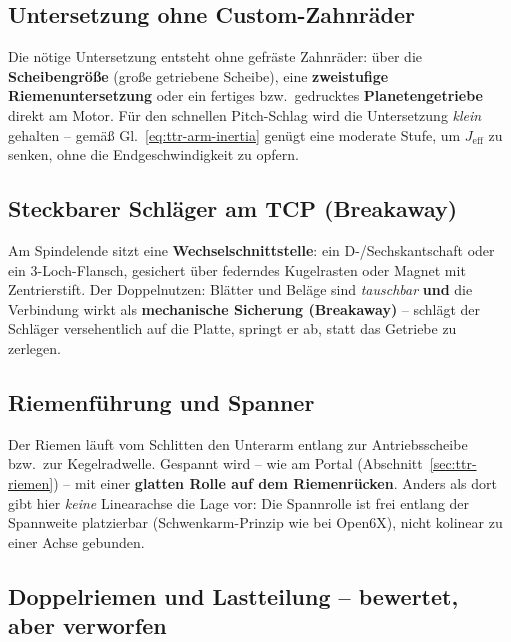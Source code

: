 \subsection{Untersetzung ohne Custom-Zahnr\"ader}
\label{sec:ttr-arm-untersetzung}

Die n\"otige Untersetzung entsteht ohne gefr\"aste Zahnr\"ader: \"uber die
\textbf{Scheibengr\"o\ss e} (gro\ss e getriebene Scheibe), eine
\textbf{zweistufige Riemenuntersetzung} oder ein fertiges bzw.\ gedrucktes
\textbf{Planetengetriebe} direkt am Motor. F\"ur den schnellen Pitch-Schlag wird
die Untersetzung \emph{klein} gehalten -- gem\"a\ss{}
Gl.~\eqref{eq:ttr-arm-inertia} gen\"ugt eine moderate Stufe, um $J_{\mathrm{eff}}$
zu senken, ohne die Endgeschwindigkeit zu opfern.

\subsection{Steckbarer Schl\"ager am TCP (Breakaway)}
\label{sec:ttr-arm-breakaway}

Am Spindelende sitzt eine \textbf{Wechselschnittstelle}: ein D-/Sechskantschaft
oder ein 3-Loch-Flansch, gesichert \"uber federndes Kugelrasten oder Magnet mit
Zentrierstift. Der Doppelnutzen: Bl\"atter und Bel\"age sind \emph{tauschbar}
\textbf{und} die Verbindung wirkt als \textbf{mechanische Sicherung (Breakaway)}
-- schl\"agt der Schl\"ager versehentlich auf die Platte, springt er ab, statt das
Getriebe zu zerlegen.

\subsection{Riemenf\"uhrung und Spanner}
\label{sec:ttr-arm-riemen}

Der Riemen l\"auft vom Schlitten den Unterarm entlang zur Antriebsscheibe bzw.\
zur Kegelradwelle. Gespannt wird -- wie am Portal
(Abschnitt~\ref{sec:ttr-riemen}) -- mit einer \textbf{glatten Rolle auf dem
Riemenr\"ucken}. Anders als dort gibt hier \emph{keine} Linearachse die Lage vor:
Die Spannrolle ist frei entlang der Spannweite platzierbar (Schwenkarm-Prinzip wie
bei Open6X), nicht kolinear zu einer Achse gebunden.

\subsection{Doppelriemen und Lastteilung -- bewertet, aber verworfen}
\label{sec:ttr-arm-doppelriemen}

